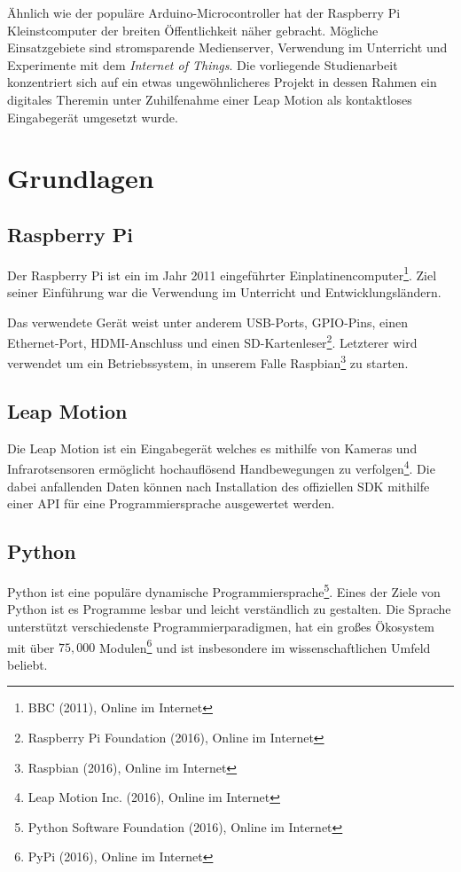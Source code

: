 \documentclass[a4paper, fontsize=12pt, toc=bibliographynumbered]{scrreprt}
\begin{document}
Ähnlich wie der populäre Arduino-Microcontroller hat der Raspberry Pi
Kleinstcomputer der breiten Öffentlichkeit näher gebracht.  Mögliche
Einsatzgebiete sind stromsparende Medienserver, Verwendung im
Unterricht und Experimente mit dem \emph{Internet of Things}.  Die
vorliegende Studienarbeit konzentriert sich auf ein etwas
ungewöhnlicheres Projekt in dessen Rahmen ein digitales Theremin unter
Zuhilfenahme einer Leap Motion als kontaktloses Eingabegerät umgesetzt
wurde.

\chapter{Grundlagen}

\section{Raspberry Pi}

Der Raspberry Pi ist ein im Jahr 2011 eingeführter
Einplatinencomputer\footnote{BBC (2011), Online im Internet}.  Ziel
seiner Einführung war die Verwendung im Unterricht und
Entwicklungsländern.

Das verwendete Gerät weist unter anderem USB-Ports, \ac{GPIO}-Pins,
einen Ethernet-Port, HDMI-Anschluss und einen
SD-Kartenleser\footnote{Raspberry Pi Foundation (2016), Online im
  Internet}. Letzterer wird verwendet um ein Betriebssystem, in
unserem Falle Raspbian\footnote{Raspbian (2016), Online im Internet}
zu starten.

\section{Leap Motion}

Die Leap Motion ist ein Eingabegerät welches es mithilfe von Kameras
und Infrarotsensoren ermöglicht hochauflösend Handbewegungen zu
verfolgen\footnote{Leap Motion Inc. (2016), Online im Internet}.  Die
dabei anfallenden Daten können nach Installation des offiziellen
\ac{SDK} mithilfe einer \ac{API} für eine Programmiersprache
ausgewertet werden.

\section{Python}

Python ist eine populäre dynamische Programmiersprache\footnote{Python
  Software Foundation (2016), Online im Internet}.  Eines der Ziele
von Python ist es Programme lesbar und leicht verständlich zu
gestalten. Die Sprache unterstützt verschiedenste
Programmierparadigmen, hat ein großes Ökosystem mit über $75,000$
Modulen\footnote{PyPi (2016), Online im Internet} und ist
insbesondere im wissenschaftlichen Umfeld beliebt.
\end{document}
